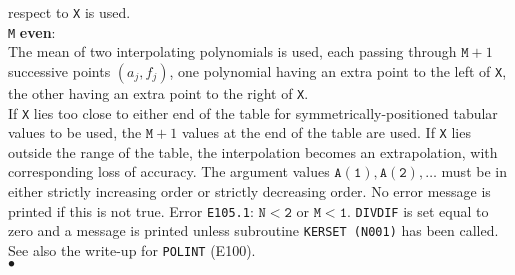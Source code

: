 respect to {\tt X} is used. \\
{\tt M} {\bf even}: \\
The mean of two interpolating polynomials is used, each passing through
$\mathtt{M}+1$ successive points $(a_j,f_j)$,
one polynomial having an extra point to the left of {\tt X}, the other
having an extra point to the right of {\tt X}. \\
If {\tt X} lies too close to either end of the table for
symmetrically-positioned tabular values to be used, the $\mathtt{M}+1$
values at the end of the table are used. If {\tt X} lies outside the
range of the table, the interpolation becomes an extrapolation, with
corresponding loss of accuracy.
\Restrict
The argument values $\mathtt{A(1),A(2)},\ldots$ must be in either
strictly increasing order or strictly decreasing order.
No error message is printed if this is not true.
\newpage
\Errorh
Error {\tt E105.1}:  $\mathtt{N<2}$ or $\mathtt{M<1}$.
{\tt DIVDIF} is set equal to zero and a message is printed
unless subroutine {\tt KERSET (N001)} has been called.
\Notes
See also the write-up for {\tt POLINT} (E100).
\\ $\bullet$
